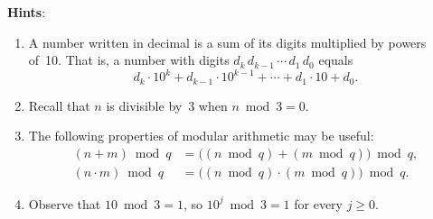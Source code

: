 \documentclass[11pt]{article}
\begin{document}
\noindent
\textbf{Hints}:
\begin{enumerate}[itemsep=4pt]
  \item A number written in decimal is a sum of its digits
        multiplied by powers of~10.  That is, a number with
        digits $d_k\, d_{k-1}\, \cdots\, d_1\, d_0$ equals
        \[
          d_k \cdot 10^k + d_{k-1} \cdot 10^{k-1} + \cdots
          + d_1 \cdot 10 + d_0.
        \]
  \item Recall that $n$ is divisible by~3 when
        $n \bmod 3 = 0$.
  \item The following properties of modular arithmetic may
        be useful:
        \begin{align*}
          (n + m) \bmod q &= \bigl((n \bmod q) +
                             (m \bmod q)\bigr) \bmod q, \\
          (n \cdot m) \bmod q &= \bigl((n \bmod q) \cdot
                             (m \bmod q)\bigr) \bmod q.
        \end{align*}
  \item Observe that $10 \bmod 3 = 1$, so
        $10^j \bmod 3 = 1$ for every $j \ge 0$.
\end{enumerate}
\end{document}

